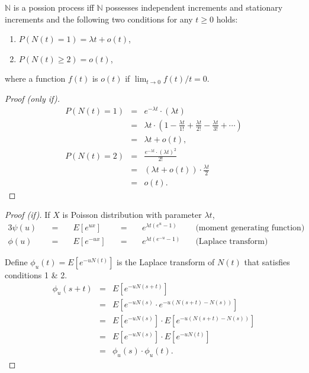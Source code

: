 \begin{theorem}[操作型定義] \label{thm:op_def}
$ \mathbb{N} $ is a possion process iff $ \mathbb{N} $ possesses independent increments and stationary increments and the following two conditions for any $ t \ge 0 $ holds:
\begin{enumerate}
  \item $ P(N(t) = 1) = \lambda t + o(t) $,
  \item $ P(N(t) \ge 2) = o(t) $,
\end{enumerate}
where a function $ f(t) $ is $ o(t) $ if $ \lim_{t \to 0} f(t) / t = 0 $.

\begin{proof}[Proof (only if)]
\begin{eqnarray*}
P(N(t) = 1)
  & = & e^{-\lambda t} \cdot (\lambda t) \\
  & = & \lambda t \cdot \left( 1 - \frac{\lambda t}{1!} + \frac{\lambda t}{2!} - \frac{\lambda t}{3!} + \cdots \right) \\
  & = & \lambda t + o(t), \\
P(N(t) = 2)
  & = & \frac{e^{-\lambda t} \cdot (\lambda t)^{2}}{2!} \\
  & = & (\lambda t + o(t)) \cdot \frac{\lambda t}{2} \\
  & = & o(t).
\end{eqnarray*}
\end{proof}

\begin{proof}[Proof (if)]
If $ X $ is Poisson distribution with parameter $ \lambda t $,
\begin{alignat*}{3}
\psi(u) & \quad=\quad & E[e^{ux}] & \quad=\quad & e^{\lambda t (e^{u} - 1)} & \quad\text{(moment generating function)} \\
\phi(u) & \quad=\quad & E[e^{-ux}] & \quad=\quad & e^{\lambda t (e^{-u} - 1)} & \quad\text{(Laplace transform)}
\end{alignat*}

Define $ \phi_{u}(t) = E[e^{-uN(t)}] $ is the Laplace transform of $ N(t) $ that satisfies conditions 1 \& 2.
\begin{eqnarray*}
\phi_{u}(s + t)
  & = & E[e^{-uN(s + t)}] \\
  & = & E[e^{-uN(s)} \cdot e^{-u(N(s + t) - N(s))}] \\
  & = & E[e^{-uN(s)}] \cdot E[e^{-u(N(s + t) - N(s))}] \\
  & = & E[e^{-uN(s)}] \cdot E[e^{-uN(t)}] \\
  & = & \phi_{u}(s) \cdot \phi_{u}(t).
\end{eqnarray*}


\end{proof}
\end{theorem}
